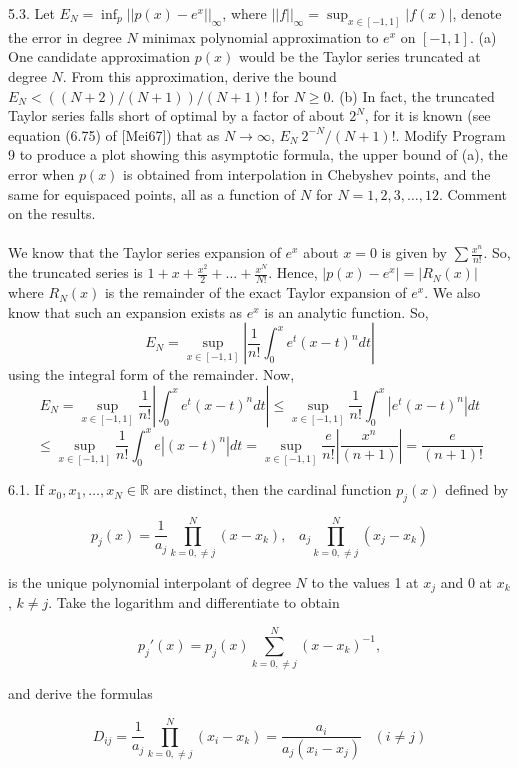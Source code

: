 \documentclass[12pt]{article}
\begin{document}
\newpage

\newpage

\newpage

5.3. Let $E_N = \inf_p||p(x)-e^x||_{\infty}$, where $||f||_{\infty}=\sup_{x\in[-1,1]}|f (x)|$, denote the error in degree $N$ minimax polynomial approximation to $e^x$ on $[-1, 1]$. (a) One candidate approximation $p(x)$ would be the Taylor series truncated at degree $N$. From this approximation, derive the bound $E_N<((N + 2)/(N + 1))/(N + 1)!$ for $N\geq0$. (b) In fact, the truncated Taylor series falls short of optimal by a factor of about $2^N$, for it is known (see equation (6.75) of [Mei67]) that as $N\rightarrow\infty$, $E_N~2^{-N}/(N + 1)!$. Modify Program 9 to produce a plot showing this asymptotic formula, the upper bound of (a), the error when $p(x)$ is obtained from interpolation in Chebyshev points, and the same for equispaced points, all as a function of $N$ for $N = 1, 2, 3,\ldots,12$. Comment on the results.\\\\

We know that the Taylor series expansion of $e^x$ about $x=0$ is given by $\sum\frac{x^n}{n!}$. So, the truncated series is $1+x+\frac{x^2}{2}+\ldots+\frac{x^N}{N!}$. Hence, $|p(x)-e^x|=|R_N(x)|$ where $R_N(x)$ is the remainder of the exact Taylor expansion of $e^x$. We also know that such an expansion exists as $e^x$ is an analytic function. So,
$$E_N=\sup_{x\in[-1,1]}|\frac{1}{n!}\int_0^xe^t(x-t)^ndt|$$
using the integral form of the remainder. Now,
$$E_N=\sup_{x\in[-1,1]}\frac{1}{n!}|\int_0^xe^t(x-t)^ndt|\leq\sup_{x\in[-1,1]}\frac{1}{n!}\int_0^x|e^t(x-t)^n|dt$$
$$\leq\sup_{x\in[-1,1]}\frac{1}{n!}\int_0^xe|(x-t)^n|dt=\sup_{x\in[-1,1]}\frac{e}{n!}|\frac{x^n}{(n+1)}|=\frac{e}{(n+1)!}$$ 

\newpage

\newpage

6.1. If $x_0,x_1,\ldots,x_N\in\mathbb{R}$ are distinct, then the cardinal function $p_j(x)$ defined by

$$p_j(x)=\frac{1}{a_j}\prod_{k=0,\neq j}^N(x-x_k),\;\;\;a_j\prod_{k=0,\neq j}^N(x_j-x_k)$$

is the unique polynomial interpolant of degree $N$ to the values 1 at $x_j$ and 0 at $x_k$, $k\neq j$. Take the logarithm and differentiate to obtain

$$p_j'(x)=p_j(x)\sum_{k=0,\neq j}^N(x-x_k)^{-1},$$

and derive the formulas

$$D_{ij}=\frac{1}{a_j}\prod_{k=0,\neq j}^N(x_i-x_k)=\frac{a_i}{a_j(x_i-x_j)}\;\;\;(i\neq j)$$
\end{document}
